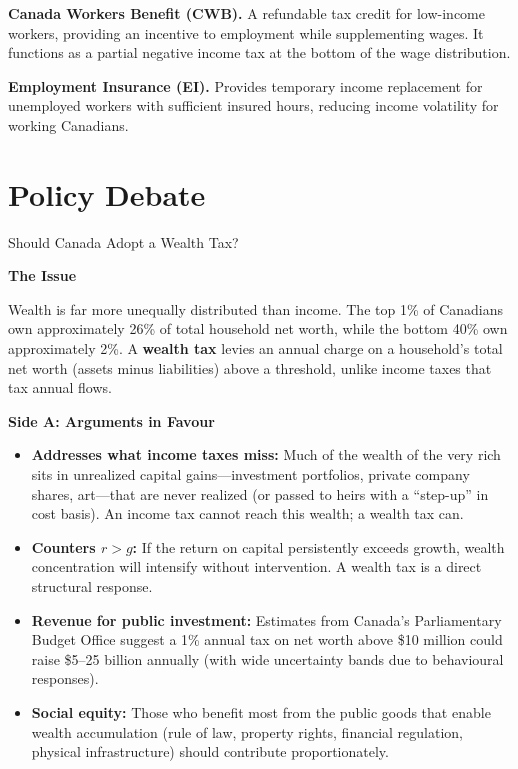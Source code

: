 \textbf{Canada Workers Benefit (CWB).} A refundable tax credit for low-income workers, providing an incentive to employment while supplementing wages. It functions as a partial negative income tax at the bottom of the wage distribution.

\textbf{Employment Insurance (EI).} Provides temporary income replacement for unemployed workers with sufficient insured hours, reducing income volatility for working Canadians.

\section{Policy Debate}

\begin{policydebate}{Should Canada Adopt a Wealth Tax?}

\textbf{The Issue}

Wealth is far more unequally distributed than income. The top 1\% of Canadians own approximately 26\% of total household net worth, while the bottom 40\% own approximately 2\%. A \textbf{wealth tax} levies an annual charge on a household's total net worth (assets minus liabilities) above a threshold, unlike income taxes that tax annual flows.

\vspace{8pt}
\textbf{Side A: Arguments in Favour}

\begin{itemize}
  \item \textbf{Addresses what income taxes miss:} Much of the wealth of the very rich sits in unrealized capital gains---investment portfolios, private company shares, art---that are never realized (or passed to heirs with a ``step-up'' in cost basis). An income tax cannot reach this wealth; a wealth tax can.
  \item \textbf{Counters $r > g$:} If the return on capital persistently exceeds growth, wealth concentration will intensify without intervention. A wealth tax is a direct structural response.
  \item \textbf{Revenue for public investment:} Estimates from Canada's Parliamentary Budget Office suggest a 1\% annual tax on net worth above \$10 million could raise \$5--25 billion annually (with wide uncertainty bands due to behavioural responses).
  \item \textbf{Social equity:} Those who benefit most from the public goods that enable wealth accumulation (rule of law, property rights, financial regulation, physical infrastructure) should contribute proportionately.
\end{itemize}


\end{policydebate}
